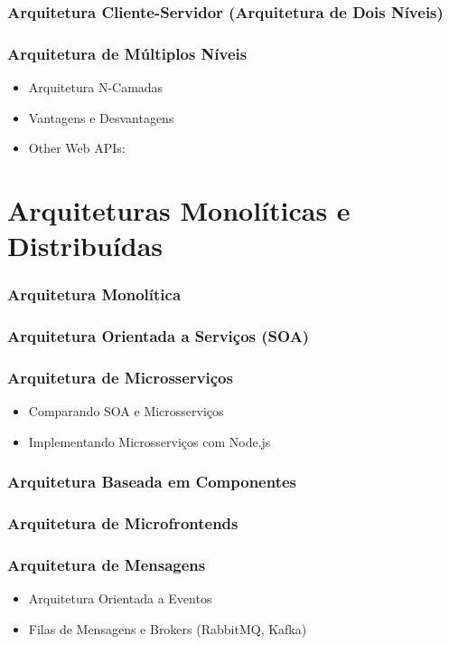 \subsubsection{Arquitetura Cliente-Servidor (Arquitetura de Dois Níveis)}
\subsubsection{Arquitetura de Múltiplos Níveis}
\begin{itemize}
\item Arquitetura N-Camadas
\item Vantagens e Desvantagens
\item Other Web APIs: 
\end{itemize}


\section{Arquiteturas Monolíticas e Distribuídas}

\subsubsection{Arquitetura Monolítica}
\subsubsection{Arquitetura Orientada a Serviços (SOA)}
\subsubsection{Arquitetura de Microsserviços}
\begin{itemize}
\item Comparando SOA e Microsserviços
\item Implementando Microsserviços com Node.js
\end{itemize}
\subsubsection{Arquitetura Baseada em Componentes}
\subsubsection{Arquitetura de Microfrontends}
\subsubsection{Arquitetura de Mensagens}
\begin{itemize}
\item Arquitetura Orientada a Eventos
\item Filas de Mensagens e Brokers (RabbitMQ, Kafka)
\end{itemize}
